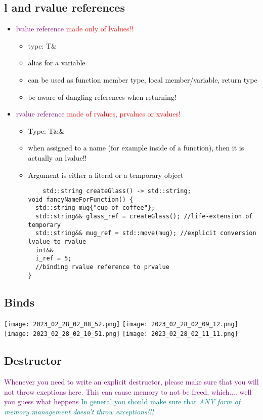 \documentclass[main.tex,fontsize=8pt,paper=a4,paper=portrait,DIV=calc,]{scrartcl}
\begin{document}
\subsection{l and rvalue references}
\begin{itemize}
\item \textcolor{purple}{lvalue reference} \textcolor{red}{made only of lvalues!!}
  \begin{itemize}
    \item type: T\&
  \item \textcolor{black}{alias for a variable}
  \item \textcolor{black}{can be used as function member type, local member/variable, return type}
  \item \textcolor{black}{be aware of dangling references when returning!}
  \end{itemize} 
\item \textcolor{purple}{rvalue reference} \textcolor{red}{made of rvalues, prvalues or xvalues!}
  \begin{itemize}
    \item \textcolor{black}{Type: T\&\&}
  \item \textcolor{black}{when assigned to a name (for example inside of a function), then it is actually an lvalue!!}
  \item \textcolor{black}{Argument is either a literal or a temporary object}\newline 
    \begin{lstlisting}
    std::string createGlass() -> std::string;
void fancyNameForFunction() { 
  std::string mug{"cup of coffee"};
  std::string&& glass_ref = createGlass(); //life-extension of temporary
  std::string&& mug_ref = std::move(mug); //explicit conversion lvalue to rvalue
  int&&
  i_ref = 5;
  //binding rvalue reference to prvalue
}
    \end{lstlisting}
  \end{itemize} 
\end{itemize} 

\subsection{Binds}
\texttt{[image: 2023\_02\_28\_02\_08\_52.png]}
\texttt{[image: 2023\_02\_28\_02\_09\_12.png]}\newline
\texttt{[image: 2023\_02\_28\_02\_10\_51.png]}
\texttt{[image: 2023\_02\_28\_02\_11\_11.png]}

\subsection{Destructor}
\textcolor{purple}{Whenever you need to write an explicit destructor, please make sure that you will not throw exeptions here. This can cause memory to not be freed, which.... well you guess what heppens}
\textcolor{teal}{In general you should make sure that \emph{ANY form of memory management doesn't throw exceptions!!!}}
\end{document}
